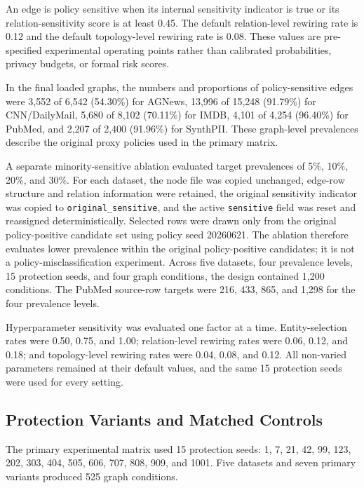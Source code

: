 \documentclass[preprint,12pt]{elsarticle}
\begin{document}
An edge is policy sensitive when its internal sensitivity indicator is true or its relation-sensitivity score is at least 0.45. The default relation-level rewiring rate is 0.12 and the default topology-level rewiring rate is 0.08. These values are pre-specified experimental operating points rather than calibrated probabilities, privacy budgets, or formal risk scores.

In the final loaded graphs, the numbers and proportions of policy-sensitive edges were 3,552 of 6,542 (54.30\%) for AGNews, 13,996 of 15,248 (91.79\%) for CNN/DailyMail, 5,680 of 8,102 (70.11\%) for IMDB, 4,101 of 4,254 (96.40\%) for PubMed, and 2,207 of 2,400 (91.96\%) for SynthPII. These graph-level prevalences describe the original proxy policies used in the primary matrix.

A separate minority-sensitive ablation evaluated target prevalences of 5\%, 10\%, 20\%, and 30\%. For each dataset, the node file was copied unchanged, edge-row structure and relation information were retained, the original sensitivity indicator was copied to \nolinkurl{original_sensitive}, and the active \nolinkurl{sensitive} field was reset and reassigned deterministically. Selected rows were drawn only from the original policy-positive candidate set using policy seed 20260621. The ablation therefore evaluates lower prevalence within the original policy-positive candidates; it is not a policy-misclassification experiment. Across five datasets, four prevalence levels, 15 protection seeds, and four graph conditions, the design contained 1,200 conditions. The PubMed source-row targets were 216, 433, 865, and 1,298 for the four prevalence levels.

Hyperparameter sensitivity was evaluated one factor at a time. Entity-selection rates were 0.50, 0.75, and 1.00; relation-level rewiring rates were 0.06, 0.12, and 0.18; and topology-level rewiring rates were 0.04, 0.08, and 0.12. All non-varied parameters remained at their default values, and the same 15 protection seeds were used for every setting.

\subsection{Protection Variants and Matched Controls}

The primary experimental matrix used 15 protection seeds: 1, 7, 21, 42, 99, 123, 202, 303, 404, 505, 606, 707, 808, 909, and 1001. Five datasets and seven primary variants produced 525 graph conditions.
\end{document}
